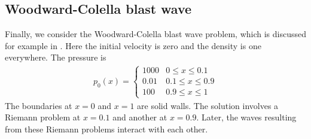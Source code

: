 \documentclass{SIAMbook2016}
\begin{document}
\hypertarget{woodward-colella-blast-wave}{%
\subsection{Woodward-Colella blast
wave}\label{woodward-colella-blast-wave}}

Finally, we consider the Woodward-Colella blast wave problem, which is
discussed for example in \cite{fvmhp}. Here the initial velocity is zero
and the density is one everywhere. The pressure is \begin{align}
    p_0(x) = \begin{cases} 1000 & 0 \le x \le 0.1 \\
                           0.01 & 0.1 \le x \le 0.9 \\
                           100  & 0.9 \le x \le 1
    \end{cases}
\end{align} The boundaries at \(x=0\) and \(x=1\) are solid walls. The
solution involves a Riemann problem at \(x=0.1\) and another at
\(x=0.9\). Later, the waves resulting from these Riemann problems
interact with each other.
\end{document}
